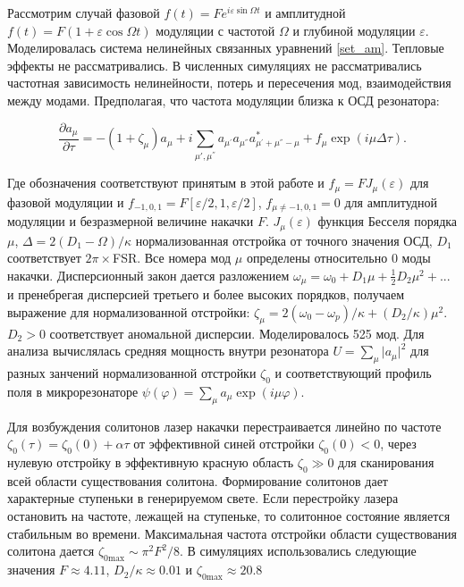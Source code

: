 Рассмотрим случай \cite{Lobanov2016} фазовой $f(t)=F e^{i\varepsilon\sin\Omega t}$ и амплитудной $f(t)=F(1+\varepsilon\cos\Omega t)$  модуляции с частотой $\Omega$ и глубиной модуляции $\varepsilon$. Моделировалась система нелинейных связанных уравнений \ref{set_am}. Тепловые эффекты не рассматривались. В численных симуляциях не рассматривались частотная зависимость нелинейности, потерь и пересечения мод, взаимодействия между модами. Предполагая, что частота модуляции близка к ОСД резонатора:

\begin{equation}
\frac{\partial a_\mu}{\partial \tau}=-(1+\zeta_\mu)a_\mu+i\sum_{\mu',\mu^{''}}a_{\mu^{'}} a_{\mu^{''}} a^{*}_{\mu^{'}+\mu^{''}-\mu}+f_{\mu}\exp(i\mu\Delta\tau).
\end{equation}

Где обозначения соответствуют принятым в этой работе и $f_\mu=F J_\mu(\varepsilon)$ для фазовой модуляции и $f_{-1,0,1}=F[\varepsilon/2,1,\varepsilon/2]$,  $f_{\mu \neq -1,0,1}=0$ для амплитудной модуляции и безразмерной величине накачки $F$. $J_\mu(\varepsilon)$ функция Бесселя порядка $\mu$, $\Delta=2(D_1-\Omega)/\kappa$ нормализованная отстройка от точного значения ОСД, $D_1$ соответствует $2\pi\times$FSR. Все номера мод $\mu$ определены относительно 0 моды накачки. Дисперсионный закон дается разложением $\omega_\mu=\omega_0+D_1\mu+\frac{1}{2}D_2\mu^2+...$ и пренебрегая дисперсией третьего и более высоких порядков, получаем выражение для нормализованной отстройки: $\zeta_\mu=2(\omega_0-\omega_p)/\kappa+(D_2/\kappa)\mu^2$. $D_2>0$ соответствует аномальной дисперсии. Моделировалось 525 мод. Для анализа вычислялась средняя мощность внутри резонатора $U=\sum_{\mu} \vert a_\mu\vert^2$ для разных занчений нормализованной отстройки $\zeta_0$ и соответствующий профиль поля в микрорезонаторе $\psi(\varphi)=\sum_{\mu} a_{\mu}\exp(i\mu\varphi)$.

Для возбуждения солитонов лазер накачки перестраивается линейно по частоте $\zeta_{0}(\tau)=\zeta_{0}(0)+\alpha\tau$ от эффективной синей отстройки $\zeta_0(0)<0$, через нулевую отстройку в эффективную красную область $\zeta_0\gg0$ для сканирования всей области существования солитона. Формирование солитонов дает характерные ступеньки в генерируемом свете. Если перестройку лазера остановить на частоте, лежащей на ступеньке, то солитонное состояние является стабильным во времени. Максимальная частота отстройки области существования солитона \cite{Herr2014} дается $\zeta_{0\text{max}}\sim {\pi^2 F^2}/{8}$. В симуляциях использовались следующие значения $F\approx 4.11$, $D_{2}/\kappa\approx {0.01}$ и $\zeta_{0\text{max}}\approx 20.8$

